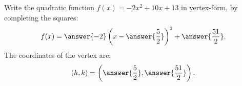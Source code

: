 \documentclass{ximera}
\author{Ivo Terek}
\begin{document}
\begin{exercise}
Write the quadratic function $f(x) = -2x^2 + 10x + 13$ in vertex-form, by completing the squares: $$f(x) = \answer{-2}\left(x-\answer{\frac{5}{2}}\right)^2+\answer{\frac{51}{2}}.$$
The coordinates of the vertex are: $$(h,k) = \left(\answer{\frac{5}{2}},\answer{\frac{51}{2}}\right).$$
\end{exercise}
\end{document}
